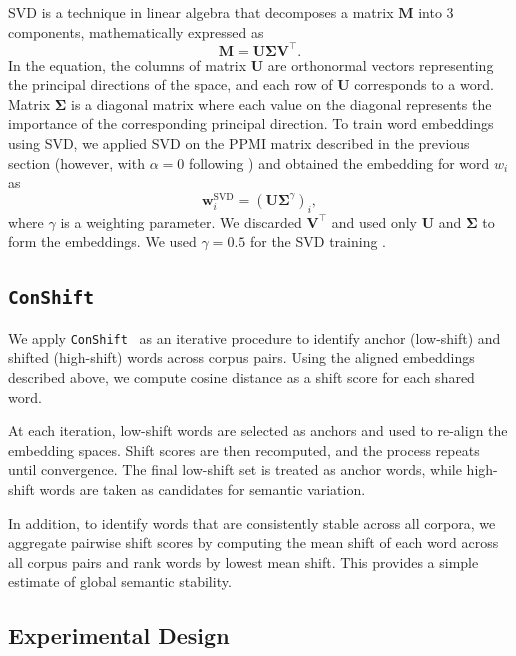 \documentclass[11pt]{article}
\begin{document}
SVD is a technique in linear algebra that decomposes a matrix \( \mathbf{M} \) into 3 components, mathematically expressed as
\[ \mathbf{M} = \mathbf{U}\mathbf{\Sigma}\mathbf{V}^{\top}. \]
In the equation, the columns of matrix \( \mathbf{U} \) are orthonormal vectors representing the principal directions of the space, and each row of \( \mathbf{U} \) corresponds to a word. Matrix \( \mathbf{\Sigma} \) is a diagonal matrix where each value on the diagonal represents the importance of the corresponding principal direction. To train word embeddings using SVD, we applied SVD on the PPMI matrix described in the previous section (however, with \( \alpha = 0 \) following \citet{hamilton2016diachronic}) and obtained the embedding for word \( w_i \) as
\[ \mathbf{w}_i^{\text{SVD}} = (\mathbf{U}\mathbf{\Sigma}^{\gamma})_i, \]
where \( \gamma \) is a weighting parameter. We discarded \( \mathbf{V}^{\top} \) and used only \( \mathbf{U} \) and \( \mathbf{\Sigma} \) to form the embeddings. We used \( \gamma = 0.5 \) for the SVD training \cite{hamilton2016diachronic}.

\subsection{\texttt{ConShift}}

We apply \texttt{ConShift}~\cite{arrington2025conshift} as an iterative procedure to identify anchor (low-shift) and shifted (high-shift) words across corpus pairs. Using the aligned embeddings described above, we compute cosine distance as a shift score for each shared word.

At each iteration, low-shift words are selected as anchors and used to re-align the embedding spaces. Shift scores are then recomputed, and the process repeats until convergence. The final low-shift set is treated as anchor words, while high-shift words are taken as candidates for semantic variation.

In addition, to identify words that are consistently stable across all corpora, we aggregate pairwise shift scores by computing the mean shift of each word across all corpus pairs and rank words by lowest mean shift. This provides a simple estimate of global semantic stability.

\subsection{Experimental Design}
\end{document}
